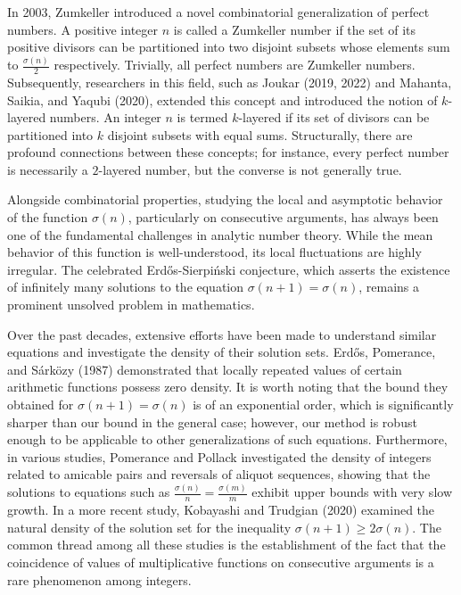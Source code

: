 \documentclass[12pt, a4paper]{article}
\theoremstyle{plain}
\theoremstyle{definition}
\begin{document}
In 2003, Zumkeller introduced a novel combinatorial generalization of perfect numbers. A positive integer $n$ is called a Zumkeller number if the set of its positive divisors can be partitioned into two disjoint subsets whose elements sum to $\frac{\sigma(n)}{2}$ respectively. Trivially, all perfect numbers are Zumkeller numbers. Subsequently, researchers in this field, such as Joukar (2019, 2022) and Mahanta, Saikia, and Yaqubi (2020), extended this concept and introduced the notion of $k$-layered numbers. An integer $n$ is termed $k$-layered if its set of divisors can be partitioned into $k$ disjoint subsets with equal sums. Structurally, there are profound connections between these concepts; for instance, every perfect number is necessarily a $2$-layered number, but the converse is not generally true.

Alongside combinatorial properties, studying the local and asymptotic behavior of the function $\sigma(n)$, particularly on consecutive arguments, has always been one of the fundamental challenges in analytic number theory. While the mean behavior of this function is well-understood, its local fluctuations are highly irregular. The celebrated Erdős-Sierpiński conjecture, which asserts the existence of infinitely many solutions to the equation $\sigma(n + 1) = \sigma(n)$, remains a prominent unsolved problem in mathematics.

Over the past decades, extensive efforts have been made to understand similar equations and investigate the density of their solution sets. Erdős, Pomerance, and Sárközy (1987) demonstrated that locally repeated values of certain arithmetic functions possess zero density. It is worth noting that the bound they obtained for $\sigma(n + 1) = \sigma(n)$ is of an exponential order, which is significantly sharper than our bound in the general case; however, our method is robust enough to be applicable to other generalizations of such equations. Furthermore, in various studies, Pomerance and Pollack investigated the density of integers related to amicable pairs and reversals of aliquot sequences, showing that the solutions to equations such as $\frac{\sigma(n)}{n} = \frac{\sigma(m)}{m}$ exhibit upper bounds with very slow growth. In a more recent study, Kobayashi and Trudgian (2020) examined the natural density of the solution set for the inequality $\sigma(n + 1) \geq 2\sigma(n)$. The common thread among all these studies is the establishment of the fact that the coincidence of values of multiplicative functions on consecutive arguments is a rare phenomenon among integers.
\end{document}
